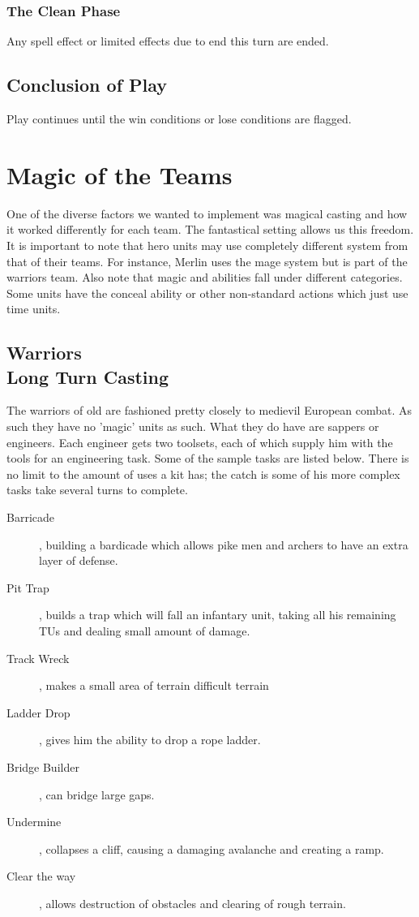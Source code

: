 \documentclass[a4paper]{article}
\begin{document}
\subsubsection{The Clean Phase}
Any spell effect or limited effects due to end this turn are ended.

\subsection{Conclusion of Play}
Play continues until the win conditions or lose conditions are flagged.


\newpage \section{Magic of the Teams}

One of the diverse factors we wanted to implement was magical casting and how it worked differently for each team. The fantastical setting allows us this freedom. It is important to note that hero units may use completely different system from that of their teams. For instance, Merlin uses the mage system but is part of the warriors team. Also note that magic and abilities fall under different categories. Some units have the conceal ability or other non-standard actions which just use time units.

\subsection{Warriors \\ Long Turn Casting}

The warriors of old are fashioned pretty closely to medievil European combat. As such they have no 'magic' units as such. What they do have are sappers or engineers. Each engineer gets two toolsets, each of which supply him with the tools for an engineering task. Some of the sample tasks are listed below. There is no limit to the amount of uses a kit has; the catch is some of his more complex tasks take several turns to complete.

\begin{description}
\item[Barricade], building a bardicade which allows pike men and archers to have an extra layer of defense.
\item[Pit Trap], builds a trap which will fall an infantary unit, taking all his remaining TUs and dealing small amount of damage.
\item[Track Wreck], makes a small area of terrain difficult terrain
\item[Ladder Drop], gives him the ability to drop a rope ladder.
\item[Bridge Builder], can bridge large gaps.
\item[Undermine], collapses a cliff, causing a damaging avalanche and creating a ramp.
\item[Clear the way], allows destruction of obstacles and clearing of rough terrain.
\end{description}
\end{document}
